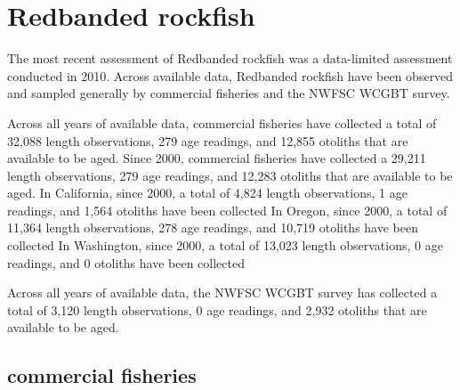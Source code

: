 \documentclass[11pt,
  english,
  letterpaper,
]{article}
\begin{document}

\hypertarget{redbanded-rockfish}{%
\section{Redbanded rockfish}\label{redbanded-rockfish}}

\leavevmode\tagmcend\tagstructend


The most recent assessment of Redbanded rockfish was a data-limited assessment conducted in 2010. Across available data, Redbanded rockfish have been observed and sampled generally by commercial fisheries and the NWFSC WCGBT survey.

\leavevmode\tagmcend\tagstructend\par


Across all years of available data, commercial fisheries have collected a total of 32,088 length observations, 279 age readings, and 12,855 otoliths that are available to be aged. Since 2000, commercial fisheries have collected a 29,211 length observations, 279 age readings, and 12,283 otoliths that are available to be aged. In California, since 2000, a total of 4,824 length observations, 1 age readings, and 1,564 otoliths have been collected In Oregon, since 2000, a total of 11,364 length observations, 278 age readings, and 10,719 otoliths have been collected In Washington, since 2000, a total of 13,023 length observations, 0 age readings, and 0 otoliths have been collected

\leavevmode\tagmcend\tagstructend\par


Across all years of available data, the NWFSC WCGBT survey has collected a total of 3,120 length observations, 0 age readings, and 2,932 otoliths that are available to be aged.

\leavevmode\tagmcend\tagstructend\par


\hypertarget{commercial-fisheries-38}{%
\subsection{commercial fisheries}\label{commercial-fisheries-38}}
\end{document}
